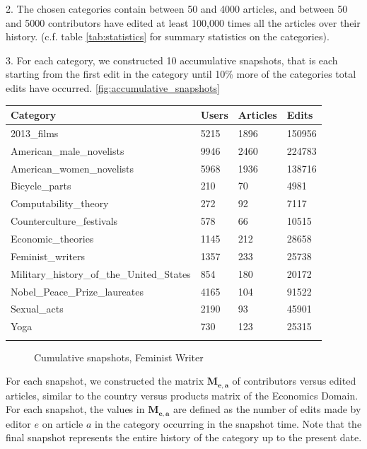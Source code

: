 \documentclass{acm_proc_article-sp}
\begin{document}
2. The chosen categories contain between 50 and 4000 articles, and between 50 and 5000 contributors have edited at least 100,000 times all the articles over their history. (c.f. table \ref{tab:statistics} for summary statistics on the categories). 

3. For each category, we constructed 10 accumulative snapshots, that is each starting from the first edit in the category until 10\% more of the categories total edits have occurred. \ref{fig:accumulative_snapshots}

\begin{tabular}{llll}
\toprule
Category & Users & Articles &  Edits \\
\midrule
2013\_films &  5215 &     1896 &  150956 \\
American\_male\_novelists &  9946 &     2460 &  224783 \\
American\_women\_novelists &  5968 &     1936 &  138716 \\
Bicycle\_parts &   210 &       70 &    4981 \\
Computability\_theory &   272 &       92 &    7117 \\
Counterculture\_festivals &   578 &       66 &   10515 \\
Economic\_theories &  1145 &      212 &   28658 \\
Feminist\_writers &  1357 &      233 &   25738 \\
Military\_history\_of\_the\_United\_States &   854 &      180 &   20172 \\
Nobel\_Peace\_Prize\_laureates &  4165 &      104 &   91522 \\
Sexual\_acts &  2190 &       93 &   45901 \\
Yoga &   730 &      123 &   25315 \\
\bottomrule
\label{tab:statistics}
\end{tabular}

\begin{figure}[!t]
\centering
\caption{Cumulative snapshots, Feminist Writer}
\label{fig:cumsnaps}
\end{figure}

 For each snapshot, we constructed the matrix $\mathbf{M_{e,a}}$ of contributors versus edited articles, similar to the country versus products matrix of the Economics Domain. For each snapshot, the values in $\mathbf{M_{e,a}}$ are defined as the number of edits made by editor $e$ on article $a$ in the category occurring in the snapshot time. Note that the final snapshot represents the entire history of the category up to the present date.
\end{document}
